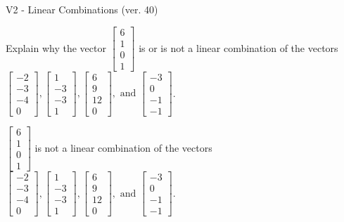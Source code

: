 \begin{exercise}
  \begin{exerciseTitle}V2 - Linear Combinations (ver. 40)\end{exerciseTitle}
  \begin{exerciseStatement}
    Explain why the vector \(\left[\begin{array}{c}
6 \\
1 \\
0 \\
1
\end{array}\right]\)  is or is not a linear 
	combination of the vectors \(\left[\begin{array}{c}
-2 \\
-3 \\
-4 \\
0
\end{array}\right] , \left[\begin{array}{c}
1 \\
-3 \\
-3 \\
1
\end{array}\right] , \left[\begin{array}{c}
6 \\
9 \\
12 \\
0
\end{array}\right] , \text{ and } \left[\begin{array}{c}
-3 \\
0 \\
-1 \\
-1
\end{array}\right]\).
	


  \end{exerciseStatement}
  \begin{exerciseAnswer}
   \(\left[\begin{array}{c}
6 \\
1 \\
0 \\
1
\end{array}\right]\) 
  	 is not  
	a linear combination of the vectors \(\left[\begin{array}{c}
-2 \\
-3 \\
-4 \\
0
\end{array}\right] , \left[\begin{array}{c}
1 \\
-3 \\
-3 \\
1
\end{array}\right] , \left[\begin{array}{c}
6 \\
9 \\
12 \\
0
\end{array}\right] , \text{ and } \left[\begin{array}{c}
-3 \\
0 \\
-1 \\
-1
\end{array}\right]\).


\end{exerciseAnswer}
\end{exercise}
